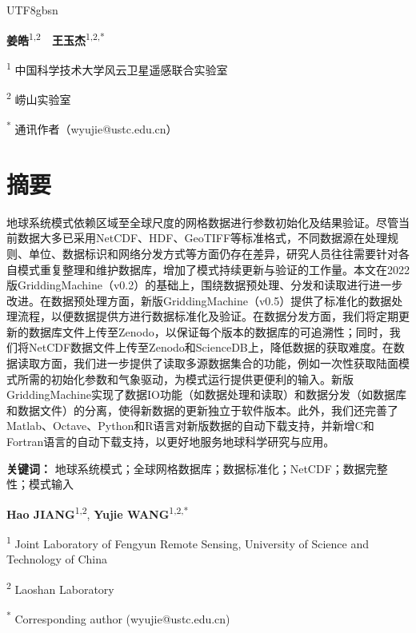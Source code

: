 \documentclass[numdoi]{chinese}
\begin{document}
\doublespacing
\begin{CJK}{UTF8}{gbsn}

%
%
{\centering
\par{}
\normalsize
\par\noindent \textbf{姜皓}\textsuperscript{1,2}　\textbf{王玉杰}\textsuperscript{1,2,*}
\par\noindent \textsuperscript{1} 中国科学技术大学风云卫星遥感联合实验室
\par\noindent \textsuperscript{2} 崂山实验室
\par\noindent \textsuperscript{*} 通讯作者（wyujie@ustc.edu.cn）\\
}


\section*{摘要}
地球系统模式依赖区域至全球尺度的网格数据进行参数初始化及结果验证。尽管当前数据大多已采用NetCDF、HDF、GeoTIFF等标准格式，不同数据源在处理规则、单位、数据标识和网络分发方式等方面仍存在差异，研究人员往往需要针对各自模式重复整理和维护数据库，增加了模式持续更新与验证的工作量。本文在2022版GriddingMachine（v0.2）的基础上，围绕数据预处理、分发和读取进行进一步改进。在数据预处理方面，新版GriddingMachine（v0.5）提供了标准化的数据处理流程，以便数据提供方进行数据标准化及验证。在数据分发方面，我们将定期更新的数据库文件上传至Zenodo，以保证每个版本的数据库的可追溯性；同时，我们将NetCDF数据文件上传至Zenodo和ScienceDB上，降低数据的获取难度。在数据读取方面，我们进一步提供了读取多源数据集合的功能，例如一次性获取陆面模式所需的初始化参数和气象驱动，为模式运行提供更便利的输入。新版GriddingMachine实现了数据IO功能（如数据处理和读取）和数据分发（如数据库和数据文件）的分离，使得新数据的更新独立于软件版本。此外，我们还完善了Matlab、Octave、Python和R语言对新版数据的自动下载支持，并新增C和Fortran语言的自动下载支持，以更好地服务地球科学研究与应用。

\textbf{关键词：} 地球系统模式；全球网格数据库；数据标准化；NetCDF；数据完整性；模式输入


\hspace{10em}
{
\centering
\par{}
\par\noindent \textbf{Hao JIANG}\textsuperscript{1,2}, \textbf{Yujie WANG}\textsuperscript{1,2,*}
\par\noindent \textsuperscript{1} Joint Laboratory of Fengyun Remote Sensing, University of Science and Technology of China
\par\noindent \textsuperscript{2} Laoshan Laboratory
\par\noindent \textsuperscript{*} Corresponding author (wyujie@ustc.edu.cn)\\
}



\end{CJK}
\end{document}
